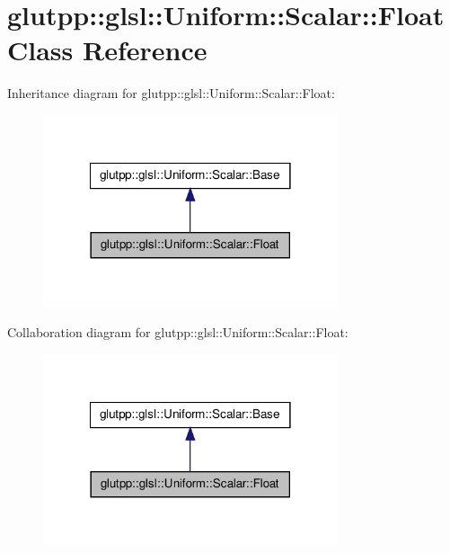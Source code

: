 \hypertarget{classglutpp_1_1glsl_1_1Uniform_1_1Scalar_1_1Float}{\section{glutpp\-:\-:glsl\-:\-:\-Uniform\-:\-:\-Scalar\-:\-:\-Float \-Class \-Reference}
\label{classglutpp_1_1glsl_1_1Uniform_1_1Scalar_1_1Float}
}


\-Inheritance diagram for glutpp\-:\-:glsl\-:\-:\-Uniform\-:\-:\-Scalar\-:\-:\-Float\-:\nopagebreak
\begin{figure}[H]
\begin{center}
\leavevmode
\includegraphics[width=246pt]{classglutpp_1_1glsl_1_1Uniform_1_1Scalar_1_1Float__inherit__graph}
\end{center}
\end{figure}


\-Collaboration diagram for glutpp\-:\-:glsl\-:\-:\-Uniform\-:\-:\-Scalar\-:\-:\-Float\-:\nopagebreak
\begin{figure}[H]
\begin{center}
\leavevmode
\includegraphics[width=246pt]{classglutpp_1_1glsl_1_1Uniform_1_1Scalar_1_1Float__coll__graph}
\end{center}
\end{figure}
